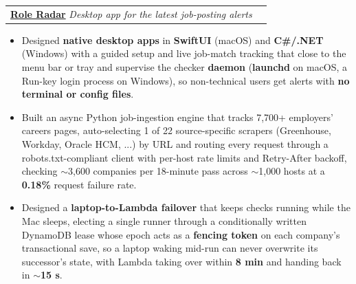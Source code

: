 \documentclass[letterpaper,11pt]{article}
\makeatletter
\newcommand{\SectionListBegin}{\begin{itemize}[leftmargin=0.15in, label={}]}
\newcommand{\BulletItems}[1]{
  \item
    \begin{itemize}[label={-}, leftmargin=*, labelsep=0.3em, topsep=0pt, partopsep=0pt, itemsep=0pt, parsep=0pt]
      \small #1
    \end{itemize}\vspace{-5pt}
}
\newcommand{\SLSubheadingItemLink}[4]{
  \vspace{-2pt}\item
    \begin{tabular*}{0.97\textwidth}[t]{l@{\extracolsep{\fill}}r}
      \textbf{\href{#2}{#1}} \textbar{} \textit{\small #3} & {\small #4} \\
    \end{tabular*}\vspace{-7pt}
}
\makeatother
\begin{document}
    \SLSubheadingItemLink
      {Role Radar}{https://github.com/anupreetsingh/Role-Radar}
      {Desktop app for the latest job-posting alerts}{} %
    \BulletItems{

      
      \item Designed \textbf{native desktop apps} in \textbf{SwiftUI} (macOS) and \textbf{C\#/.NET} (Windows) with a guided setup and live job-match tracking that close to the menu bar or tray and supervise the checker \textbf{daemon} (\textbf{launchd} on macOS, a Run-key login process on Windows), so non-technical users get alerts with \textbf{no terminal or config files}.

      \item Built an async Python job-ingestion engine that tracks 7,700+ employers' careers pages, auto-selecting 1 of 22 source-specific scrapers (Greenhouse, Workday, Oracle HCM, ...) by URL and routing every request through a robots.txt-compliant client with per-host rate limits and Retry-After backoff, checking $\sim$3,600 companies per 18-minute pass across $\sim$1,000 hosts at a \textbf{0.18\%} request failure rate.
      \item Designed a \textbf{laptop-to-Lambda failover} that keeps checks running while the Mac sleeps, electing a single runner through a conditionally written DynamoDB lease whose epoch acts as a \textbf{fencing token} on each company's transactional save, so a laptop waking mid-run can never overwrite its successor's state, with Lambda taking over within \textbf{8 min} and handing back in \textbf{$\sim$15 s}.

    }
\end{document}
